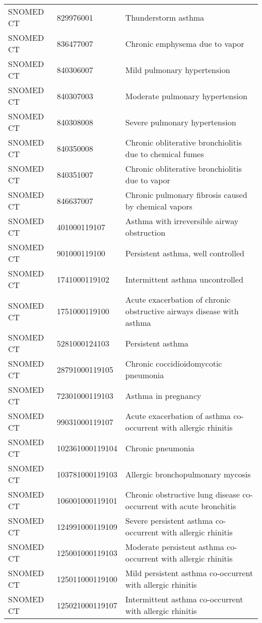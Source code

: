 \begin{table}[ht]
\begin{tabular}{lll}
  SNOMED CT & 829976001 & Thunderstorm asthma \\ 
  SNOMED CT & 836477007 & Chronic emphysema due to vapor \\ 
  SNOMED CT & 840306007 & Mild pulmonary hypertension \\ 
  SNOMED CT & 840307003 & Moderate pulmonary hypertension \\ 
  SNOMED CT & 840308008 & Severe pulmonary hypertension \\ 
  SNOMED CT & 840350008 & Chronic obliterative bronchiolitis due to chemical fumes \\ 
  SNOMED CT & 840351007 & Chronic obliterative bronchiolitis due to vapor \\ 
  SNOMED CT & 846637007 & Chronic pulmonary fibrosis caused by chemical vapors \\ 
  SNOMED CT & 401000119107 & Asthma with irreversible airway obstruction \\ 
  SNOMED CT & 901000119100 & Persistent asthma, well controlled \\ 
  SNOMED CT & 1741000119102 & Intermittent asthma uncontrolled \\ 
  SNOMED CT & 1751000119100 & Acute exacerbation of chronic obstructive airways disease with asthma \\ 
  SNOMED CT & 5281000124103 & Persistent asthma \\ 
  SNOMED CT & 28791000119105 & Chronic coccidioidomycotic pneumonia \\ 
  SNOMED CT & 72301000119103 & Asthma in pregnancy \\ 
  SNOMED CT & 99031000119107 & Acute exacerbation of asthma co-occurrent with allergic rhinitis \\ 
  SNOMED CT & 102361000119104 & Chronic pneumonia \\ 
  SNOMED CT & 103781000119103 & Allergic bronchopulmonary mycosis \\ 
  SNOMED CT & 106001000119101 & Chronic obstructive lung disease co-occurrent with acute bronchitis \\ 
  SNOMED CT & 124991000119109 & Severe persistent asthma co-occurrent with allergic rhinitis \\ 
  SNOMED CT & 125001000119103 & Moderate persistent asthma co-occurrent with allergic rhinitis \\ 
  SNOMED CT & 125011000119100 & Mild persistent asthma co-occurrent with allergic rhinitis \\ 
  SNOMED CT & 125021000119107 & Intermittent asthma co-occurrent with allergic rhinitis \\ 

\end{tabular}
\end{table}
